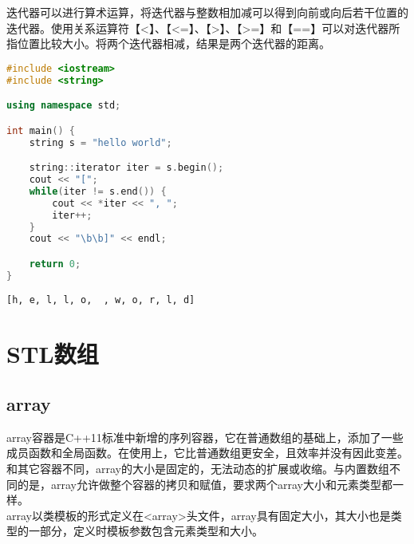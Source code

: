 迭代器可以进行算术运算，将迭代器与整数相加减可以得到向前或向后若干位置的迭代器。使用关系运算符【<】、【<=】、【>】、【>=】和【==】可以对迭代器所指位置比较大小。将两个迭代器相减，结果是两个迭代器的距离。\\


\begin{lstlisting}[language=C++]
#include <iostream>
#include <string>

using namespace std;

int main() {
    string s = "hello world";

    string::iterator iter = s.begin();
    cout << "[";
    while(iter != s.end()) {
        cout << *iter << ", ";
        iter++;
    }
    cout << "\b\b]" << endl;

    return 0;
}
\end{lstlisting}

\begin{tcolorbox}
	\begin{verbatim}
[h, e, l, l, o,  , w, o, r, l, d]
	\end{verbatim}
\end{tcolorbox}

\newpage

\section{STL数组}

\subsection{array}

array容器是C++11标准中新增的序列容器，它在普通数组的基础上，添加了一些成员函数和全局函数。在使用上，它比普通数组更安全，且效率并没有因此变差。和其它容器不同，array的大小是固定的，无法动态的扩展或收缩。与内置数组不同的是，array允许做整个容器的拷贝和赋值，要求两个array大小和元素类型都一样。\\

array以类模板的形式定义在<array>头文件，array具有固定大小，其大小也是类型的一部分，定义时模板参数包含元素类型和大小。

